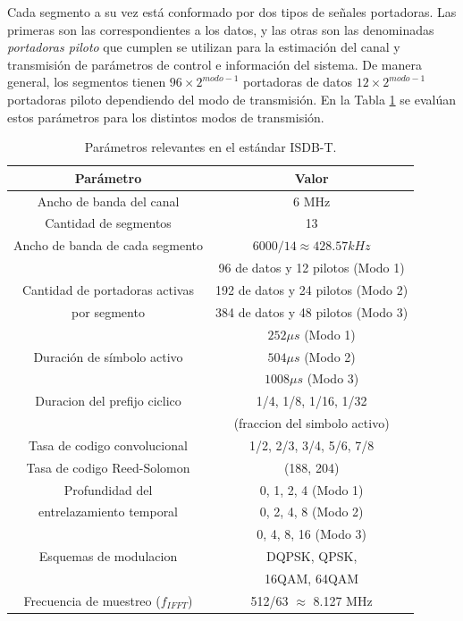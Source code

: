 Cada segmento a su vez est\'a conformado por dos tipos de señales portadoras. Las primeras son las correspondientes a los datos, y las otras son las denominadas \textit{portadoras piloto} que cumplen se utilizan para la estimaci\'on del canal y transmisi\'on de par\'ametros de control e informaci\'on del sistema.
De manera general, los segmentos tienen $96 \times 2^{modo-1}$ portadoras de datos $12 \times 2^{modo-1}$ portadoras piloto dependiendo del modo de transmisi\'on. En la Tabla \ref{parametros_ISDBT} se eval\'uan estos par\'ametros para los distintos modos de transmisi\'on. 



\begin{table}[h!]
\centering
\begin{tabular}{|c|c|}
\hline
\textbf{Parámetro} 				& \textbf{Valor}\\
\hline
Ancho de banda del canal 		& 6 MHz\\
\hline
Cantidad de segmentos 			& 13 \\
\hline
Ancho de banda de cada segmento & $6000/14 \approx 428.57kHz$ \\
\hline
  											& 96 de datos y 12 pilotos (Modo 1) \\
Cantidad de portadoras activas  & 192 de datos y 24 pilotos (Modo 2) \\
 		por segmento									& 384 de datos y 48 pilotos (Modo 3)\\
\hline
 								& $252 \mu s$ (Modo 1)\\
Duración de símbolo activo 		& $504 \mu s$ (Modo 2) \\
								& $1008 \mu s$ (Modo 3) \\
\hline
Duracion del prefijo ciclico 	& 1/4, 1/8, 1/16, 1/32 \\
 								& (fraccion del simbolo activo)\\
\hline
Tasa de codigo convolucional 	& 1/2, 2/3, 3/4, 5/6, 7/8\\
\hline
Tasa de codigo Reed-Solomon 	& (188, 204) \\
\hline
 	Profundidad del			& 0, 1, 2, 4 (Modo 1) \\
entrelazamiento temporal & 0, 2, 4, 8 (Modo 2) \\
		 & 0, 4, 8, 16 (Modo 3)\\
\hline
Esquemas de modulacion & DQPSK, QPSK,\\
 & 16QAM, 64QAM\\
 \hline
 Frecuencia de muestreo ($f_{IFFT}$) & 512/63 $\approx$ 8.127 MHz\\
 \hline
\end{tabular}
\caption{\label{parametros_ISDBT} Par\'ametros relevantes en el est\'andar ISDB-T.}
\end{table}



